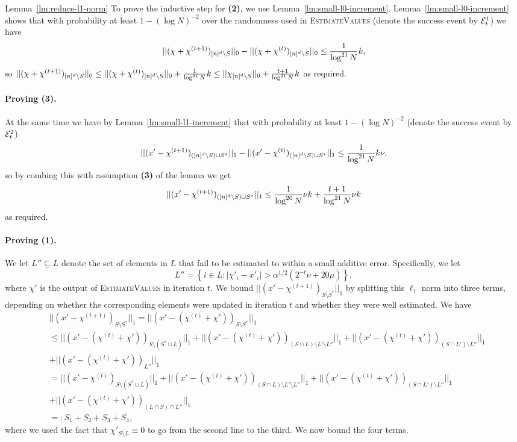 \begin{proofof}{Lemma~\ref{lm:reduce-l1-norm}}
To prove the inductive step for {\bf (2)}, we use Lemma~\ref{lm:small-l0-increment}. Lemma~\ref{lm:small-l0-increment} shows that with probability at least $1-(\log N)^{-2}$ over the randomness used in \textsc{EstimateValues} (denote the success event by ${\mathcal{E}}^1_t$) we have
$$
||(\chi+\chi^{(t+1)})_{{[n]^d}\setminus S}||_0-||(\chi+\chi^{(t)})_{{[n]^d}\setminus S}||_0\leq \frac{1}{\log^{21} N}k,
$$
so $||(\chi+\chi^{(t+1)})_{{[n]^d}\setminus S}||_0\leq ||(\chi+\chi^{(t)})_{{[n]^d}\setminus S}||_0+\frac{1}{\log^{21} N}k\leq ||\chi_{{[n]^d}\setminus S}||_0+\frac{t+1}{\log^{21} N}k$ as required.


\paragraph{Proving {\bf (3)}.}
At the same time we have by Lemma~\ref{lm:small-l1-increment} that with probability at least $1-(\log N)^{-2}$ (denote the success event by ${\mathcal{E}}^2_t$)
$$
||(x'-\chi^{(t+1)})_{({[n]^d}\setminus S)\cup S^*}||_1-||(x'-\chi^{(t)})_{({[n]^d}\setminus S)\cup S^*}||_1\leq \frac{1}{\log^{21} N}k \nu,
$$
so by combing this with assumption {\bf (3)} of the lemma we get
$$
||(x'-\chi^{(t+1)})_{({[n]^d}\setminus S)\cup S^*}||_1\leq \frac{1}{\log^{20} N}\nu k+\frac{t+1}{\log^{21} N}\nu k
$$
as required. 


\paragraph{Proving {\bf (1)}.}
We let $L''\subseteq L$ denote the set of elements in $L$ that fail to be estimated to within a small additive error. Specifically, we let
$$
L''=\left\{i\in L: |\chi'_i-x'_i|>\alpha^{1/2}\left(2^{-t}\nu+20\mu\right)\right\},
$$ 
where $\chi'$ is the output of \textsc{EstimateValues} in iteration $t$. We bound $||(x'-\chi^{(t+1)})_{S\setminus S^*}||_1$ by splitting this $\ell_1$ norm into three terms, depending on whether the corresponding elements were updated in iteration $t$ and whether they were well estimated. We have
\begin{equation}\label{eq:org-bound-pihwrve33v}
\begin{split}
&||(x'-\chi^{(t+1)})_{S\setminus S^*}||_1=||(x'-(\chi^{(t)}+\chi'))_{S\setminus S^*}||_1\\
&\leq ||(x'-(\chi^{(t)}+\chi'))_{S\setminus (S^*\cup L)}||_1+||(x'-(\chi^{(t)}+\chi'))_{(S\cap L)\setminus L'\setminus L''}||_1+||(x'-(\chi^{(t)}+\chi'))_{(S\cap L')\setminus L''}||_1\\
&+||(x'-(\chi^{(t)}+\chi'))_{L''}||_1\\
&=||(x'-\chi^{(t)})_{S\setminus (S^*\cup L)}||_1+||(x'-(\chi^{(t)}+\chi'))_{(S\cap L)\setminus L'\setminus L''}||_1+||(x'-(\chi^{(t)}+\chi'))_{(S\cap L')\setminus L''}||_1\\
&+||(x'-(\chi^{(t)}+\chi'))_{(L\cap S)\cap L''}||_1\\
&=:S_1+S_2+S_3+S_4,
\end{split}
\end{equation}
where we used the fact that $\chi'_{S\setminus L}\equiv 0$ to go from the second line to the third. We now bound the four terms. 



\end{proofof}
